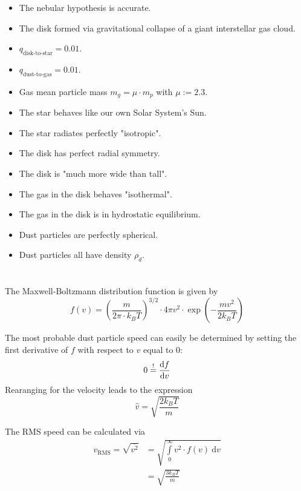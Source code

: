     \begin{itemize}
        \item The nebular hypothesis is accurate. 
        \item The disk formed via gravitational collapse of a giant interstellar gas cloud.
        \item $q_\text{disk-to-star}=0.01$.
        \item $q_\text{dust-to-gas}=0.01$.
        \item Gas mean particle mass $m_g=\mu\cdot m_p$ with $\mu:=2.3$.
        \item The star behaves like our own Solar System's Sun.
        \item The star radiates perfectly "isotropic".
        \item The disk has perfect radial symmetry.
        \item The disk is "much more wide than tall".
        \item The gas in the disk behaves "isothermal".
        \item The gas in the disk is in hydrostatic equilibrium.
        \item Dust particles are perfectly spherical.
        \item Dust particles all have density $\rho_d$.
    \end{itemize}

\section{}

    The Maxwell-Boltzmann distribution function is given by 
    \begin{equation}
        f(v)
        =\left(\frac{m}{2\pi\cdot k_BT}\right)^{3/2}
        \cdot4\pi v^2\cdot\exp\left(-\frac{mv^2}{2k_BT}\right)
    \end{equation}

    The most probable dust particle speed can easily be determined by 
    setting the first derivative of $f$ with respect to $v$ equal to 0:
    \begin{equation}
        0\overset{!}{=}\frac{\text{d} f}{\text{d} v}
    \end{equation}
    Rearanging for the velocity leads to the expression
    \begin{equation}
        \hat{v}=\sqrt{\frac{2k_BT}{m}}
    \end{equation}

    The RMS speed can be calculated via
    \begin{align}
        v_\text{RMS}
        =\sqrt{\overline{v^2}}
        &=\sqrt{\int\limits_0^\infty v^2\cdot f(v)\ \text{d}v}\\
        &=\sqrt{\frac{3k_BT}{m}}
    \end{align}


